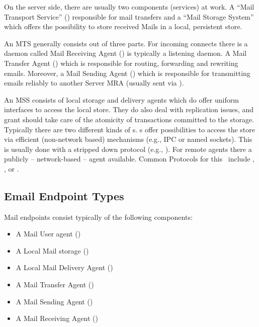 On the server side, there are usually two components (services) at work. A ``Mail Transport Service'' () responsible for mail transfers and a ``Mail Storage System'' which offers the possibility to store received Mails in a local, persistent store.\par

An MTS generally consists out of three parts. For incoming connects there is a daemon called Mail Receiving Agent () is typically a  listening daemon. A Mail Transfer Agent () which is responsible for routing, forwarding and rewriting emails. Moreover, a Mail Sending Agent () which is responsible for transmitting emails reliably to another Server MRA (usually sent via ).\par

An MSS consists of local storage and delivery agents which do offer uniform interfaces to access the local store. They do also deal with replication issues, and grant should take care of the atomicity of transactions committed to the storage. Typically there are two different kinds of s. s offer possibilities to access the store via efficient (non-network based) mechanisms (e.g., IPC or named sockets). This is usually done with a stripped down protocol (e.g., ). For remote agents there a publicly -- network-based -- agent available. Common Protocols for this \ include , , or .\par

\subsection{Email Endpoint Types}

Mail endpoints consist typically of the following components:
\begin{itemize}
	\item A Mail User agent ()
	\item A Local Mail storage ()
	\item A Local Mail Delivery Agent ()
	\item A Mail Transfer Agent ()
	\item A Mail Sending Agent ()
	\item A Mail Receiving Agent ()
\end{itemize}

